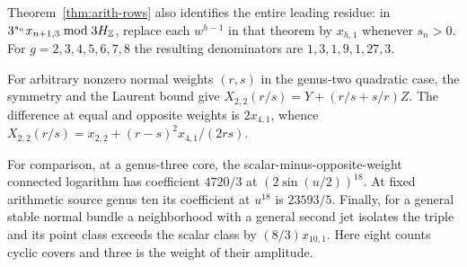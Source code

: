 Theorem~\ref{thm:arith-rows} also identifies the entire leading residue: in $3^{s_n}x_{n+1,3}\bmod3H_{\mathbb Z}$,
replace each $w^{h-1}$ in that theorem by $x_{h,1}$ whenever $s_n>0$.
For $g=2,3,4,5,6,7,8$ the resulting denominators are
$1,3,1,9,1,27,3$.

For arbitrary nonzero normal weights $(r,s)$ in the genus-two
quadratic case, the symmetry and the Laurent bound give
$X_{2,2}(r/s)=Y+(r/s+s/r)Z$. The difference at equal and opposite
weights is $2x_{4,1}$, whence
$X_{2,2}(r/s)=x_{2,2}+(r-s)^2x_{4,1}/(2rs)$.

For comparison, at a
genus-three core, the scalar-minus-opposite-weight connected logarithm
has coefficient $4720/3$ at $(2\sin(u/2))^{18}$. At fixed arithmetic
source genus ten its coefficient at $u^{18}$ is $23593/5$. Finally,
for a general stable normal bundle a neighborhood with a general second
jet isolates the triple and its point class exceeds the scalar class
by $(8/3)x_{10,1}$. Here eight counts cyclic covers and three is the
weight of their amplitude.
